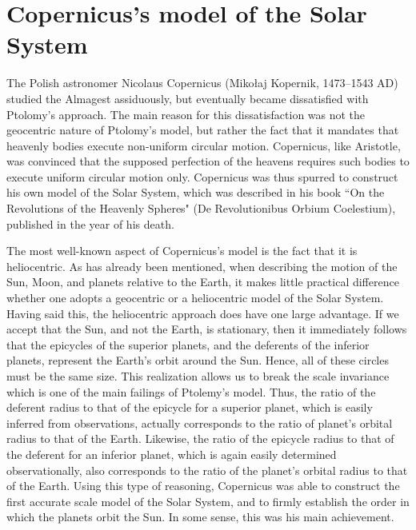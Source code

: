 \section{Copernicus's model of the Solar System}
The Polish astronomer Nicolaus Copernicus (Mikołaj Kopernik, 1473--1543 AD) studied the
Almagest assiduously, but eventually became dissatisfied with
Ptolomy's approach. The main reason for this dissatisfaction was
not the geocentric nature of Ptolomy's model, but rather the fact that it
mandates that heavenly bodies  execute non-uniform circular
motion. Copernicus, like Aristotle, was convinced that the supposed perfection
of the heavens requires  such bodies to execute uniform  circular motion only. Copernicus was thus spurred to construct his own
model of the Solar System, which was described in his book ``On the Revolutions of the Heavenly Spheres"  (De Revolutionibus Orbium Coelestium), published in the year of his death.

The most well-known aspect of Copernicus's model is the fact that it
is  heliocentric. As has already been mentioned, when describing
the motion of the Sun, Moon, and planets relative to the Earth, it makes
little practical difference whether one adopts a geocentric or a heliocentric
model of the Solar System. Having said this, the heliocentric approach does have one large advantage. If we accept that the Sun,  and not the Earth,
is stationary, then it immediately follows that the epicycles of the
superior planets, and the deferents of the inferior planets,  represent the Earth's orbit around the Sun. Hence, all of these circles
must be the same size. This realization allows us to break the
scale invariance which is one of the main failings of Ptolemy's
model. Thus, the ratio of the deferent radius to that of the
epicycle for a superior planet, which is easily inferred from observations,
actually corresponds to the ratio of planet's orbital radius to that of the
Earth. Likewise, the ratio of the epicycle radius to that of the deferent
for an inferior planet, which is again easily determined observationally, also corresponds to the ratio of the planet's
orbital radius to that of the Earth. Using this type of reasoning,
Copernicus was able to construct the first accurate scale model
of the Solar System, and to firmly establish the order in which the planets
orbit the Sun. In some sense, this was his main achievement.

